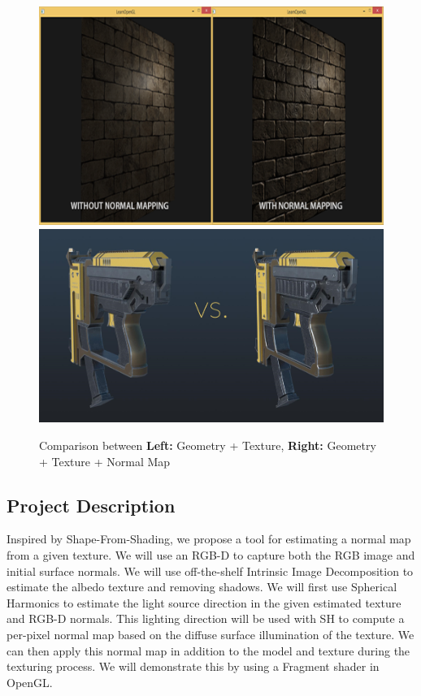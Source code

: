 \documentclass[10pt,twocolumn,letterpaper]{article}
\begin{document}
\begin{figure}[h]
	\begin{center}
		\includegraphics [scale=0.35] {image/wall.png}
		\includegraphics [scale=0.35] {image/gun.png}
	\end{center}
	\caption{Comparison between \textbf{Left:} Geometry + Texture, \textbf{Right:} Geometry + Texture + Normal Map}
	\label{fig:vgg-16}
\end{figure} 

\subsection{Project Description}
Inspired by Shape-From-Shading, we propose a tool for estimating a normal map from a given texture. We will use an RGB-D to capture both the RGB image and initial surface normals. We will use off-the-shelf Intrinsic Image Decomposition to estimate the albedo texture and removing shadows. We will first use Spherical Harmonics to estimate the light source direction in the given estimated texture and RGB-D normals. This lighting direction will be used with SH to compute a per-pixel normal map based on the diffuse surface illumination of the texture. We can then apply this normal map in addition to the model and texture during the texturing process. We will demonstrate this by using a Fragment shader in OpenGL.
\end{document}
